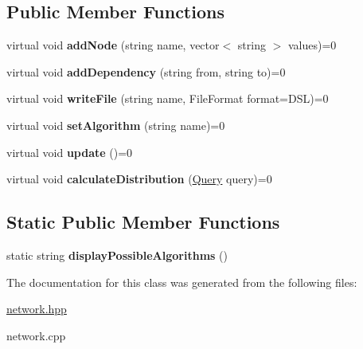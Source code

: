 \subsection*{Public Member Functions}
\begin{DoxyCompactItemize}
\item 
\hypertarget{classpct_1_1_bayesian_network_a25de1a5a824d2d01c5c043c0a213e04a}{virtual void {\bfseries add\-Node} (string name, vector$<$ string $>$ values)=0}\label{classpct_1_1_bayesian_network_a25de1a5a824d2d01c5c043c0a213e04a}

\item 
\hypertarget{classpct_1_1_bayesian_network_a656d12f66b031e4c85461e05df2e58e5}{virtual void {\bfseries add\-Dependency} (string from, string to)=0}\label{classpct_1_1_bayesian_network_a656d12f66b031e4c85461e05df2e58e5}

\item 
\hypertarget{classpct_1_1_bayesian_network_a66214e737a33c21e4fda5849d9eb771a}{virtual void {\bfseries write\-File} (string name, File\-Format format=D\-S\-L)=0}\label{classpct_1_1_bayesian_network_a66214e737a33c21e4fda5849d9eb771a}

\item 
\hypertarget{classpct_1_1_bayesian_network_accc06218f488d68a73b1f9e1144b1d18}{virtual void {\bfseries set\-Algorithm} (string name)=0}\label{classpct_1_1_bayesian_network_accc06218f488d68a73b1f9e1144b1d18}

\item 
\hypertarget{classpct_1_1_bayesian_network_a5f36ad6abc527a1aba7ccecb8b6d4300}{virtual void {\bfseries update} ()=0}\label{classpct_1_1_bayesian_network_a5f36ad6abc527a1aba7ccecb8b6d4300}

\item 
\hypertarget{classpct_1_1_bayesian_network_ae382925bdc9910878a0f636ed85a9b65}{virtual void {\bfseries calculate\-Distribution} (\hyperlink{classpct_1_1_query}{Query} query)=0}\label{classpct_1_1_bayesian_network_ae382925bdc9910878a0f636ed85a9b65}

\end{DoxyCompactItemize}
\subsection*{Static Public Member Functions}
\begin{DoxyCompactItemize}
\item 
\hypertarget{classpct_1_1_bayesian_network_a20a0fb1dd2050c25945decda2ae772bb}{static string {\bfseries display\-Possible\-Algorithms} ()}\label{classpct_1_1_bayesian_network_a20a0fb1dd2050c25945decda2ae772bb}

\end{DoxyCompactItemize}


The documentation for this class was generated from the following files\-:\begin{DoxyCompactItemize}
\item 
\hyperlink{network_8hpp}{network.\-hpp}\item 
network.\-cpp\end{DoxyCompactItemize}

